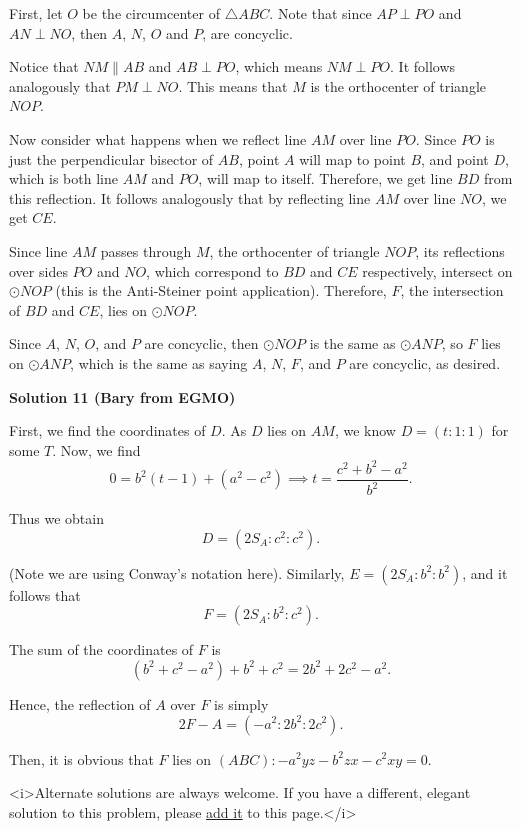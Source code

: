 \begin{enumerate}
First, let $O$ be the circumcenter of $\triangle{ABC}$. Note that since $AP \perp PO$ and $AN \perp NO$, then $A$, $N$, $O$ and $P$, are concyclic.

 Notice that $NM \parallel AB$ and $AB \perp PO$, which means $NM \perp PO$. It follows analogously that $PM \perp NO$. This means that $M$ is the orthocenter of triangle ${NOP}$.

 Now consider what happens when we reflect line $AM$ over line $PO$. Since $PO$ is just the perpendicular bisector of $AB$, point $A$ will map to point $B$, and point $D$, which is both line $AM$ and $PO$, will map to itself. Therefore, we get line $BD$ from this reflection. It follows analogously that by reflecting line $AM$ over line $NO$, we get $CE$.

 Since line $AM$ passes through $M$, the orthocenter of triangle ${NOP}$, its reflections over sides $PO$ and $NO$, which correspond to $BD$ and $CE$ respectively, intersect on $\odot{NOP}$ (this is the Anti-Steiner point application). Therefore, $F$, the intersection of $BD$ and $CE$, lies on $\odot{NOP}$.

 Since $A$, $N$, $O$, and $P$ are concyclic, then $\odot{NOP}$ is the same as $\odot{ANP}$, so $F$ lies on $\odot{ANP}$, which is the same as saying $A$, $N$, $F$, and $P$ are concyclic, as desired.

 



\textbf{Solution 11 (Bary from EGMO)}

First, we find the coordinates of $D$. As $D$ lies on $AM$, we know $D=(t:1:1)$ for some $T$. Now, we find 
 \[0=b^2(t-1)+(a^2-c^2) \implies t=\frac{c^2+b^2-a^2}{b^2}.\]

 Thus we obtain 
 \[D = (2S_A:c^2:c^2).\]

 (Note we are using Conway's notation here). Similarly, $E = (2S_A:b^2:b^2)$, and it follows that 
 \[F=(2S_A:b^2:c^2).\]

 The sum of the coordinates of $F$ is 
 \[(b^2+c^2-a^2)+b^2+c^2=2b^2+2c^2-a^2.\]

 Hence, the reflection of $A$ over $F$ is simply 
 \[2F-A=(-a^2:2b^2:2c^2).\]

 Then, it is obvious that $F$ lies on $(ABC):-a^2yz-b^2zx-c^2xy=0$.

 <i>Alternate solutions are always welcome. If you have a different, elegant solution to this problem, please \href{https://artofproblemsolving.com/wiki/index.php?title=2008\_USAMO\_Problems/Problem\_2&action=edit}{add it} to this page.</i>




\end{enumerate}
